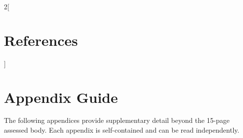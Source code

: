 \documentclass[10pt,a4paper]{article}
\begin{document}







\newpage
\begin{multicols}{2}[\section*{References}]
\printbibliography[heading=none]
\end{multicols}

\newpage
\appendix

\renewcommand{\thesection}{\AlphAlph{\value{section}}}

\section*{Appendix Guide}\label{app:guide}

The following appendices provide supplementary detail beyond the 15-page
assessed body. Each appendix is self-contained and can be read independently.
\end{document}
